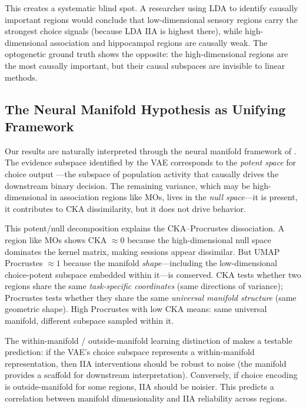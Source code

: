 \documentclass{article}
\begin{document}
This creates a systematic blind spot. A researcher using LDA to identify causally important regions would conclude that low-dimensional sensory regions carry the strongest choice signals (because LDA IIA is highest there), while high-dimensional association and hippocampal regions are causally weak. The optogenetic ground truth shows the opposite: the high-dimensional regions are the most causally important, but their causal subspaces are invisible to linear methods.

\subsection{The Neural Manifold Hypothesis as Unifying Framework}

Our results are naturally interpreted through the neural manifold framework of \citet{gallego2017neural}. The evidence subspace identified by the VAE corresponds to the \emph{potent space} for choice output \citep{kaufman2014cortical}---the subspace of population activity that causally drives the downstream binary decision. The remaining variance, which may be high-dimensional in association regions like MOs, lives in the \emph{null space}---it is present, it contributes to CKA dissimilarity, but it does not drive behavior.

This potent/null decomposition explains the CKA--Procrustes dissociation. A region like MOs shows CKA $\approx 0$ because the high-dimensional null space dominates the kernel matrix, making sessions appear dissimilar. But UMAP Procrustes $\approx 1$ because the manifold \emph{shape}---including the low-dimensional choice-potent subspace embedded within it---is conserved. CKA tests whether two regions share the same \emph{task-specific coordinates} (same directions of variance); Procrustes tests whether they share the same \emph{universal manifold structure} (same geometric shape). High Procrustes with low CKA means: same universal manifold, different subspace sampled within it.

The within-manifold / outside-manifold learning distinction of \citet{sadtler2014neural} makes a testable prediction: if the VAE's choice subspace represents a within-manifold representation, then IIA interventions should be robust to noise (the manifold provides a scaffold for downstream interpretation). Conversely, if choice encoding is outside-manifold for some regions, IIA should be noisier. This predicts a correlation between manifold dimensionality and IIA reliability across regions.
\end{document}
